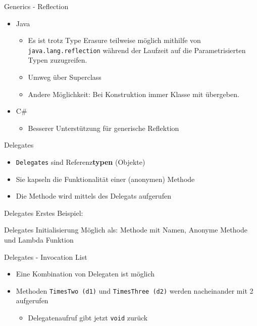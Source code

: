 \documentclass[11pt]{beamer}
\begin{document}
\begin{frame}{Generics - Reflection}
\begin{itemize}
	\item Java 
	\begin{itemize}
		\item Es ist trotz Type Erasure teilweise möglich mithilfe von \texttt{java.lang.reflection} während der Laufzeit auf die Parametrisierten Typen zuzugreifen. 
		\item \glqq Umweg\grqq{} über Superclass
		\item Andere Möglichkeit: Bei Konstruktion immer Klasse mit übergeben.
	\end{itemize}
	\item C\# 
	\begin{itemize}
		\item Besserer Unterstützung für generische Reflektion
	\end{itemize}
\end{itemize}
\end{frame}


\begin{frame}{Delegates}
\begin{itemize}
 	\item \texttt{Delegates} sind Referenz\textbf{typen} (Objekte)
 	\item Sie kapseln die Funktionalität einer (anonymen) Methode
 	\item Die Methode wird mittels des Delegats aufgerufen
\end{itemize}
	
\end{frame}
\begin{frame}{Delegates}
	Erstes Beispiel:
\end{frame}

\begin{frame}{Delegates}
	Initialisierung Möglich als: Methode mit Namen, Anonyme Methode und Lambda Funktion
\end{frame}

\begin{frame}{Delegates - Invocation List}
	\begin{itemize}
		\item  Eine Kombination von Delegaten ist möglich
		\item Methoden \texttt{TimesTwo (d1)} und \texttt{TimesThree (d2)} werden nacheinander mit 2 aufgerufen
		\begin{itemize}
			\item Delegatenaufruf gibt jetzt \texttt{void} zurück
		\end{itemize}
	\end{itemize}
\end{frame}
\end{document}

